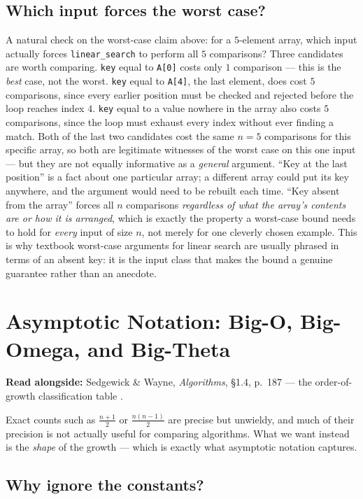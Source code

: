 \documentclass[11pt]{article}
\begin{document}
\subsection{Which input forces the worst case?}

A natural check on the worst-case claim above: for a $5$-element array,
which input actually forces \texttt{linear\_search} to perform all $5$
comparisons? Three candidates are worth comparing. \texttt{key} equal to
\texttt{A[0]} costs only $1$ comparison --- this is the \emph{best} case, not
the worst. \texttt{key} equal to \texttt{A[4]}, the last element, does cost
$5$ comparisons, since every earlier position must be checked and rejected
before the loop reaches index $4$. \texttt{key} equal to a value nowhere in
the array also costs $5$ comparisons, since the loop must exhaust every
index without ever finding a match. Both of the last two candidates cost the
same $n = 5$ comparisons for this specific array, so both are legitimate
witnesses of the worst case on this one input --- but they are not
equally informative as a \emph{general} argument. ``Key at the last
position'' is a fact about one particular array; a different array could
put its key anywhere, and the argument would need to be rebuilt each time.
``Key absent from the array'' forces all $n$ comparisons \emph{regardless of
what the array's contents are or how it is arranged}, which is exactly the
property a worst-case bound needs to hold for \emph{every} input of size
$n$, not merely for one cleverly chosen example. This is why textbook worst-case
arguments for linear search are usually phrased in terms of an absent key: it
is the input class that makes the bound a genuine guarantee rather than an
anecdote.

\section{Asymptotic Notation: Big-O, Big-Omega, and Big-Theta}
\label{sec:notation}

\textbf{Read alongside:} Sedgewick \& Wayne, \textit{Algorithms}, \S1.4, p.~187 --- the order-of-growth classification table \cite{Sedgewick2011_algorithms}.

Exact counts such as $\frac{n+1}{2}$ or $\frac{n(n-1)}{2}$ are precise but
unwieldy, and much of their precision is not actually useful for comparing
algorithms. What we want instead is the \emph{shape} of the growth ---
which is exactly what asymptotic notation captures.

\subsection{Why ignore the constants?}
\end{document}
